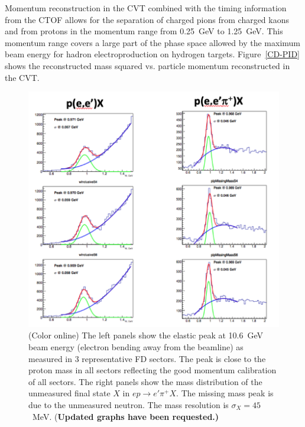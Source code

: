 \documentclass[final,3p,twocolumn]{elsarticle}
\begin{document}
Momentum reconstruction in the CVT combined with the timing information from the CTOF allows for the separation 
of charged pions from charged kaons and from protons in the momentum range from 0.25~GeV to 1.25~GeV. This
momentum range covers a large part of the phase space allowed by the maximum beam energy for hadron
electroproduction on hydrogen targets. Figure~\ref{CD-PID} shows the reconstructed mass squared vs. 
particle momentum reconstructed in the CVT.
\begin{figure}[t!]
\centerline{\includegraphics[width=1.0\columnwidth]{elastic_pi+n.png}}
\caption{(Color online) The left panels show the elastic peak at 10.6~GeV beam energy (electron bending away from the 
beamline) as measured in 3 representative FD
  sectors. The peak is close to the proton mass in all sectors reflecting the good momentum calibration of all
  sectors. The right panels show the mass distribution of the unmeasured final state $X$ in $ep \to e'\pi^+ X$.
  The missing mass peak is due to the unmeasured neutron. The mass resolution is $\sigma_X = 45$~MeV.
  {(\bf Updated graphs have been requested.)}}
\label{elastic-peak}


\end{figure}
\end{document}
